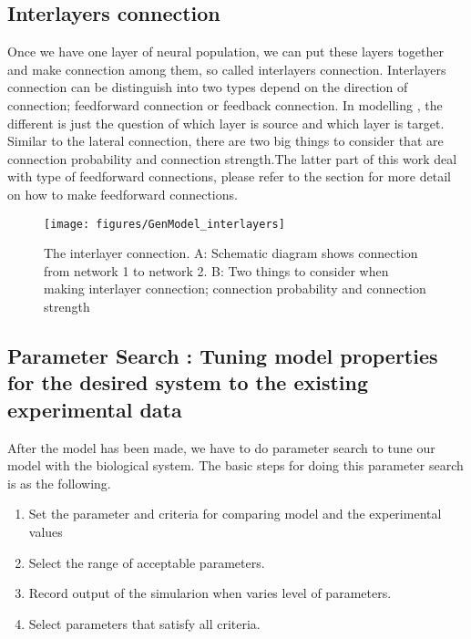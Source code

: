 \subsection{Interlayers connection}
Once we have one layer of neural population,  we can put these layers together and make connection among them, so called interlayers connection.
Interlayers connection can be distinguish into two types depend on the direction of connection; feedforward connection or feedback connection. In modelling , the different is just the question of which layer is source and which layer is target. Similar to the lateral connection, there are two big things to consider that are connection probability and connection strength.The latter part of this work deal with type of feedforward connections,  please refer to the section for more detail on how to make feedforward connections.
\begin{figure}
	\centering
	\texttt{[image: figures/GenModel\_interlayers]}
	\caption{The interlayer connection. A: Schematic diagram shows connection from network 1 to network 2. B: Two things to consider when making interlayer connection; connection probability and connection strength}
	\label{fig:GM_lateral}
\end{figure}

\subsection{Parameter Search : Tuning model properties for the desired system to the existing experimental data}

After the model has been made, we have to do parameter search to tune our model with the biological system. The basic steps for doing this parameter search is as the following. 

\begin{enumerate}
 \item Set the parameter and criteria for comparing model and the experimental values
 \item Select the range of acceptable parameters.
 \item Record output of the simularion when varies level  of parameters.
 \item Select parameters that satisfy all criteria.
 \end{enumerate}
 
